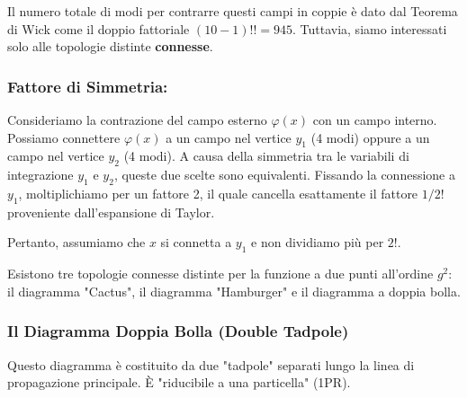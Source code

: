 \noindent Il numero totale di modi per contrarre questi campi in coppie è dato dal Teorema di Wick come il doppio fattoriale $(10-1)!! = 945$.
Tuttavia, siamo interessati solo alle topologie distinte \textbf{connesse}.

\subsubsection{ Fattore di Simmetria:}
Consideriamo la contrazione del campo esterno $\varphi(x)$ con un campo interno. Possiamo connettere $\varphi(x)$ a un campo nel vertice $y_1$ (4 modi) oppure a un campo nel vertice $y_2$ (4 modi). A causa della simmetria tra le variabili di integrazione $y_1$ e $y_2$, queste due scelte sono equivalenti.
Fissando la connessione a $y_1$, moltiplichiamo per un fattore 2, il quale cancella esattamente il fattore $1/2!$ proveniente dall'espansione di Taylor.

Pertanto, assumiamo che $x$ si connetta a $y_1$ e non dividiamo più per $2!$.

\hfill

\noindent Esistono tre topologie connesse distinte per la funzione a due punti all'ordine $g^2$: il diagramma "Cactus", il diagramma "Hamburger" e il diagramma a doppia bolla.

\subsubsection{Il Diagramma Doppia Bolla (Double Tadpole)}

Questo diagramma è costituito da due "tadpole" separati lungo la linea di propagazione principale. È "riducibile a una particella" (1PR).

